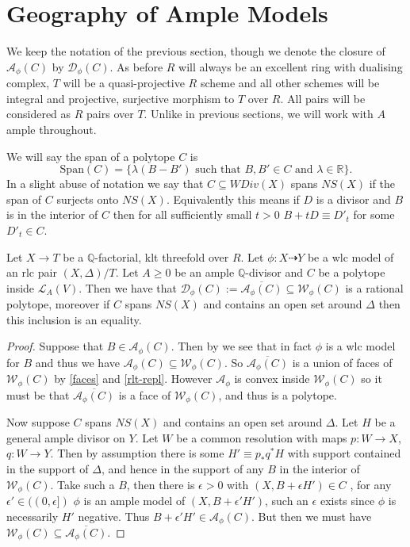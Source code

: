 	\section{Geography of Ample Models}
	
	We keep the notation of the previous section, though we denote the closure of $\mathcal{A}_{\phi}(C)$ by $\mathcal{D}_{\phi}(C)$. As before $R$ will always be an excellent ring with dualising complex, $T$ will be a quasi-projective $R$ scheme and all other schemes will be integral and projective, surjective morphism to $T$ over $R$. All pairs will be considered as $R$ pairs over $T$. Unlike in previous sections, we will work with $A$ ample throughout.
	
	We will say the span of a polytope $C$ is $$\text{Span}(C)=\{\lambda(B-B') \text{ such that } B, B' \in C \text{ and } \lambda \in \mathbb{R}\}.$$  In a slight abuse of notation we say that $C \subseteq WDiv(X)$ spans $NS(X)$ if the span of $C$ surjects onto $NS(X)$. Equivalently this means if $D$ is a divisor and $B$ is in the interior of $C$ then for all sufficiently small $t>0$ $B+tD\equiv D'_{t}$ for some $D'_{t}\in C$.
		
	\begin{lemma}\label{close}
		Let $X\to T$ be a $\mathbb{Q}$-factorial, klt threefold over $R$. Let $\phi:X \dashrightarrow Y$ be a wlc model of an rlc pair $(X,\Delta)/T$. Let $A \geq 0$ be an ample $\mathbb{Q}$-divisor and $C$ be a polytope inside $\mathcal{L}_{A}(V)$. Then we have that $\mathcal{D}_{\phi}(C):=\overline{\mathcal{A}_{\phi}(C)} \subseteq \mathcal{W}_{\phi}(C)$ is a rational polytope, moreover if $C$ spans $NS(X)$ and contains an open set around $\Delta$ then this inclusion is an equality.
	\end{lemma}
	
	\begin{proof}
		Suppose that $B \in \mathcal{A}_{\phi}(C)$. Then by \cite[Theorem 3.6.5]{BCHM10} we see that in fact $\phi$ is a wlc model for $B$ and thus we have $\mathcal{A}_{\phi}(C) \subseteq \mathcal{W}_{\phi}(C)$. So $\overline{\mathcal{A}_{\phi}(C)}$ is a union of faces of $\mathcal{W}_{\phi}(C)$ by \autoref{faces} and \autoref{rlt-repl}. However $\mathcal{A}_{\phi}$ is convex inside $\mathcal{W}_{\phi}(C)$ so it must be that $\overline{\mathcal{A}_{\phi}(C)}$ is a face of $\mathcal{W}_{\phi}(C)$, and thus is a polytope.
		
		Now suppose $C$ spans $NS(X)$ and contains an open set around $\Delta$.
		Let $H$ be a general ample divisor on $Y$. Let $W$ be a common resolution with maps $p:W \to X$, $q:W \to Y$. Then by assumption there is some $H' \equiv p_{*}q^{*}H$ with support contained in the support of $\Delta$, and hence in the support of any $B$ in the interior of $\mathcal{W}_{\phi}(C)$. Take such a $B$, then there is $\epsilon >0$ with $(X,B+\epsilon H') \in C$ , for any $\epsilon' \in ((0,\epsilon])$ $\phi$ is an ample model of $(X,B+ \epsilon' H')$, such an $\epsilon$ exists since $\phi$ is necessarily $H'$ negative. Thus $B+\epsilon' H' \in \mathcal{A}_{\phi}(C)$. But then we must have $\mathcal{W}_{\phi}(C)\subseteq \overline{\mathcal{A}_{\phi}(C)}$.
	\end{proof}
	
